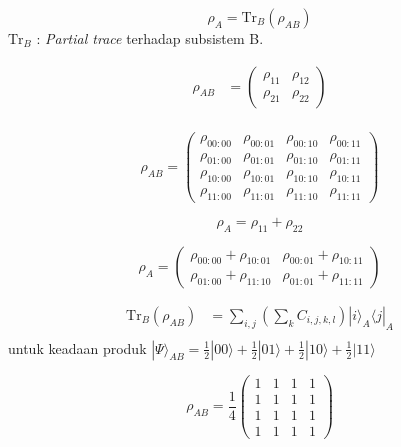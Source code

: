 \begin{equation}
    \rho_A = \text{Tr}_B(\rho_{AB})
\end{equation}
$\text{Tr}_B$ : \textit{Partial trace} terhadap subsistem B.

\begin{equation}
    \begin{split}
    \rho_{AB} &= \begin{pmatrix} \rho_{11} & \rho_{12} \\ \rho_{21} & \rho_{22} \end{pmatrix} \\ 
    \end{split}
\end{equation}

\begin{equation}
    \rho_{AB} = \begin{pmatrix} \rho_{00:00} & \rho_{00:01} & \rho_{00:10} & \rho_{00:11} \\ \rho_{01:00} & \rho_{01:01} & \rho_{01:10} & \rho_{01:11} \\ \rho_{10:00} & \rho_{10:01} & \rho_{10:10} & \rho_{10:11} \\ \rho_{11:00} & \rho_{11:01} & \rho_{11:10} & \rho_{11:11} \end{pmatrix}
\end{equation}

\begin{equation}
    \rho_A = \rho_{11} + \rho_{22}
\end{equation}

\begin{equation}
    \rho_A = \begin{pmatrix} \rho_{00:00} + \rho_{10:01} & \rho_{00:01} + \rho_{10:11} \\ \rho_{01:00} + \rho_{11:10} & \rho_{01:01} + \rho_{11:11} \end{pmatrix}
\end{equation}

\begin{equation}
    \begin{split}
    \text{Tr}_B(\rho_{AB}) &= \sum_{i,j} \left(\sum_{k} C_{i,j,k,l} \right) |i \rangle _A \langle j |_A \\
    \end{split}
\end{equation}
untuk keadaan produk $|\Psi\rangle_{AB} = \frac{1}{2}|00\rangle + \frac{1}{2}|01\rangle + \frac{1}{2}|10\rangle + \frac{1}{2}|11\rangle$ 

\begin{equation}
    \rho_{AB} = \frac{1}{4} \begin{pmatrix} 1 & 1 & 1 & 1 \\ 1 & 1 & 1 & 1 \\ 1 & 1 & 1 & 1 \\ 1 & 1 & 1 & 1 \end{pmatrix}
\end{equation}


